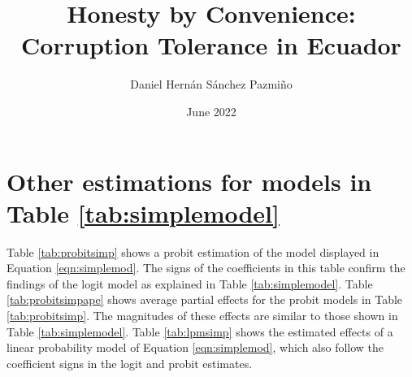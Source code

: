 \documentclass[12pt,a4]{article}
\title{Honesty by Convenience: Corruption Tolerance in Ecuador}
\author{Daniel Hernán Sánchez Pazmiño}
\date{June 2022}
\begin{document}

\section{Other estimations for models in Table \ref{tab:simplemodel}}
\label{app:second}
Table \ref{tab:probitsimp} shows a probit estimation of the model displayed in Equation \ref{eqn:simplemod}. The signs of the coefficients in this table confirm the findings of the logit model as explained in Table \ref{tab:simplemodel}. Table \ref{tab:probitsimpape} shows average partial effects for the probit models in Table \ref{tab:probitsimp}. The magnitudes of these effects are similar to those shown in Table \ref{tab:simplemodel}. Table \ref{tab:lpmsimp} shows the estimated effects of a linear probability model of Equation \ref{eqn:simplemod}, which also follow the coefficient signs in the logit and probit estimates.
\end{document}
